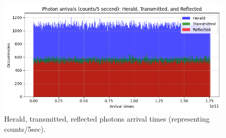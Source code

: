 \documentclass[prl,twocolumn]{revtex4-1}
\begin{document}
\begin{figure}[!h]
    \centering
    \includegraphics[width=\linewidth]{Images/photon_arrivals.png}
    \caption{Herald, transmitted, reflected photons arrival times (representing counts/5sec).}
    \label{fig:photon_arrivals}
\end{figure}
\end{document}
